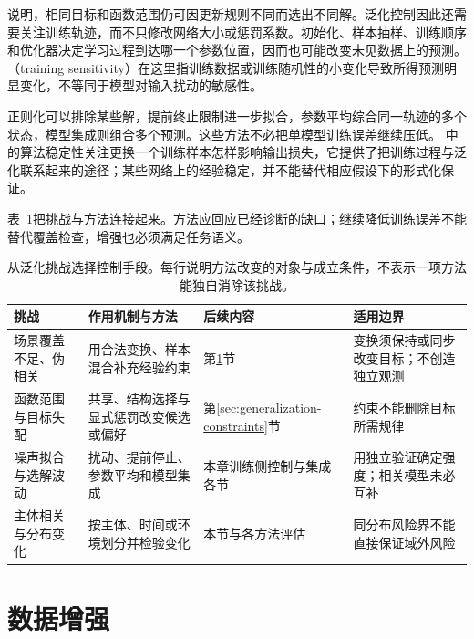 说明，相同目标和函数范围仍可因更新规则不同而选出不同解。泛化控制因此还需要关注训练轨迹，而不只修改网络大小或惩罚系数。初始化、样本抽样、训练顺序和优化器决定学习过程到达哪一个参数位置，因而也可能改变未见数据上的预测。（training sensitivity）在这里指训练数据或训练随机性的小变化导致所得预测明显变化，不等同于模型对输入扰动的敏感性。

正则化可以排除某些解，提前终止限制进一步拟合，参数平均综合同一轨迹的多个状态，模型集成则组合多个预测。这些方法不必把单模型训练误差继续压低。
中的算法稳定性关注更换一个训练样本怎样影响输出损失，它提供了把训练过程与泛化联系起来的途径；某些网络上的经验稳定，并不能替代相应假设下的形式化保证。

表~\ref{tab:generalization-challenge-remedies}把挑战与方法连接起来。方法应回应已经诊断的缺口；继续降低训练误差不能替代覆盖检查，增强也必须满足任务语义。
\begin{table}[htbp]
\centering\small
\begin{tabular}{@{}p{32mm}p{48mm}p{27mm}p{48mm}@{}}
\toprule
挑战 & 作用机制与方法 & 后续内容 & 适用边界\\
\midrule
场景覆盖不足、伪相关 & 用合法变换、样本混合补充经验约束 & 第\ref{sec:generalization-augmentation}节 & 变换须保持或同步改变目标；不创造独立观测\\
函数范围与目标失配 & 共享、结构选择与显式惩罚改变候选或偏好 & 第\ref{sec:generalization-constraints}节 & 约束不能删除目标所需规律\\
噪声拟合与选解波动 & 扰动、提前停止、参数平均和模型集成 & 本章训练侧控制与集成各节 & 用独立验证确定强度；相关模型未必互补\\
主体相关与分布变化 & 按主体、时间或环境划分并检验变化 & 本节与各方法评估 & 同分布风险界不能直接保证域外风险\\
\bottomrule
\end{tabular}
\caption{从泛化挑战选择控制手段。每行说明方法改变的对象与成立条件，不表示一项方法能独自消除该挑战。}
\label{tab:generalization-challenge-remedies}
\end{table}

\section{数据增强}
\label{sec:generalization-augmentation}

